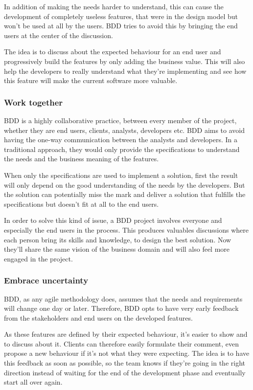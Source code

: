 In addition of making the needs harder to understand, this can cause the
development of completely useless features, that were in the design model but
won't be used at all by the users.
BDD tries to avoid this by bringing the end users at the center of the
discussion.

The idea is to discuss about the expected behaviour for an end user and
progressively build the features by only adding the business value.
This will also help the developers to really understand what they're
implementing and see how this feature will make the current software more
valuable.

\subsubsection{Work together}
BDD is a highly collaborative practice, between every member of the project,
whether they are end users, clients, analysts, developers etc.
BDD aims to avoid having the one-way communication between the analysts and
developers.
In a traditional approach, they would only provide the specifications to
understand the needs and the business meaning of the features.

When only the specifications are used to implement a solution, first the
result will only depend on the good understanding of the needs by the
developers.
But the solution can potentially miss the mark and deliver a solution that
fulfills the specifications but doesn't fit at all to the end users.

In order to solve this kind of issue, a BDD project involves everyone and
especially the end users in the process.
This produces valuables discussions where each person bring its skills and
knowledge, to design the best solution.
Now they'll share the same vision of the business domain and will also feel more
engaged in the project.

\subsubsection{Embrace uncertainty}
BDD, as any agile methodology does, assumes that the needs and requirements
will change one day or later.
Therefore, BDD opts to have very early feedback from the stakeholders and end
users on the developed features.

As these features are defined by their expected behaviour, it's easier to
show and to discuss about it.
Clients can therefore easily formulate their comment, even propose a new
behaviour if it's not what they were expecting.
The idea is to have this feedback as soon as possible, so the team knows if
they're going in the right direction instead of waiting for the end of the
development phase and eventually start all over again.

